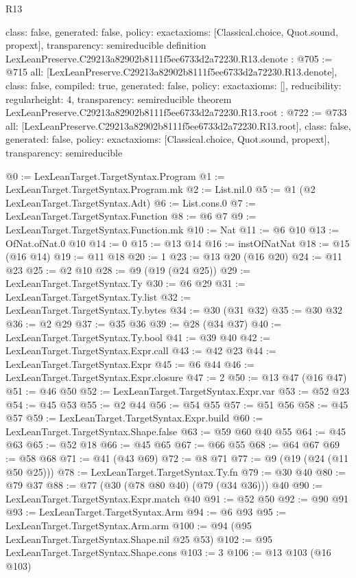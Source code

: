 \begin{lexlean}{R13}
\begin{coremodule}
{  class: false,
  generated: false,
  policy: exact{axioms: [Classical.choice, Quot.sound, propext]},
  transparency: semireducible
}
definition LexLeanPreserve.C29213a82902b8111f5ee6733d2a72230.R13.denote : @705 := @715 {
  all: [LexLeanPreserve.C29213a82902b8111f5ee6733d2a72230.R13.denote],
  class: false,
  compiled: true,
  generated: false,
  policy: exact{axioms: []},
  reducibility: regular{height: 4},
  transparency: semireducible
}
theorem LexLeanPreserve.C29213a82902b8111f5ee6733d2a72230.R13.root : @722 := @733 {
  all: [LexLeanPreserve.C29213a82902b8111f5ee6733d2a72230.R13.root],
  class: false,
  generated: false,
  policy: exact{axioms: [Classical.choice, Quot.sound, propext]},
  transparency: semireducible
}

@0 := LexLeanTarget.TargetSyntax.Program
@1 := LexLeanTarget.TargetSyntax.Program.mk
@2 := List.nil.{0}
@5 := @1 (@2 LexLeanTarget.TargetSyntax.Adt)
@6 := List.cons.{0}
@7 := LexLeanTarget.TargetSyntax.Function
@8 := @6 @7
@9 := LexLeanTarget.TargetSyntax.Function.mk
@10 := Nat
@11 := @6 @10
@13 := OfNat.ofNat.{0} @10
@14 := 0
@15 := @13 @14
@16 := instOfNatNat
@18 := @15 (@16 @14)
@19 := @11 @18
@20 := 1
@23 := @13 @20 (@16 @20)
@24 := @11 @23
@25 := @2 @10
@28 := @9 (@19 (@24 @25))
@29 := LexLeanTarget.TargetSyntax.Ty
@30 := @6 @29
@31 := LexLeanTarget.TargetSyntax.Ty.list
@32 := LexLeanTarget.TargetSyntax.Ty.bytes
@34 := @30 (@31 @32)
@35 := @30 @32
@36 := @2 @29
@37 := @35 @36
@39 := @28 (@34 @37)
@40 := LexLeanTarget.TargetSyntax.Ty.bool
@41 := @39 @40
@42 := LexLeanTarget.TargetSyntax.Expr.call
@43 := @42 @23
@44 := LexLeanTarget.TargetSyntax.Expr
@45 := @6 @44
@46 := LexLeanTarget.TargetSyntax.Expr.closure
@47 := 2
@50 := @13 @47 (@16 @47)
@51 := @46 @50
@52 := LexLeanTarget.TargetSyntax.Expr.var
@53 := @52 @23
@54 := @45 @53
@55 := @2 @44
@56 := @54 @55
@57 := @51 @56
@58 := @45 @57
@59 := LexLeanTarget.TargetSyntax.Expr.build
@60 := LexLeanTarget.TargetSyntax.Shape.false
@63 := @59 @60 @40 @55
@64 := @45 @63
@65 := @52 @18
@66 := @45 @65
@67 := @66 @55
@68 := @64 @67
@69 := @58 @68
@71 := @41 (@43 @69)
@72 := @8 @71
@77 := @9 (@19 (@24 (@11 @50 @25)))
@78 := LexLeanTarget.TargetSyntax.Ty.fn
@79 := @30 @40
@80 := @79 @37
@88 := @77 (@30 (@78 @80 @40) (@79 (@34 @36))) @40
@90 := LexLeanTarget.TargetSyntax.Expr.match @40
@91 := @52 @50
@92 := @90 @91
@93 := LexLeanTarget.TargetSyntax.Arm
@94 := @6 @93
@95 := LexLeanTarget.TargetSyntax.Arm.arm
@100 := @94 (@95 LexLeanTarget.TargetSyntax.Shape.nil @25 @53)
@102 := @95 LexLeanTarget.TargetSyntax.Shape.cons
@103 := 3
@106 := @13 @103 (@16 @103)

\end{coremodule}
\end{lexlean}
